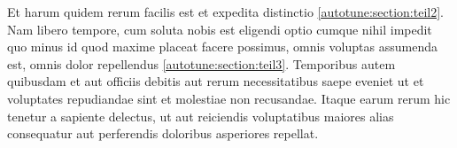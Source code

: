 Et harum quidem rerum facilis est et expedita distinctio
\ref{autotune:section:teil2}.
Nam libero tempore, cum soluta nobis est eligendi optio cumque nihil
impedit quo minus id quod maxime placeat facere possimus, omnis
voluptas assumenda est, omnis dolor repellendus
\ref{autotune:section:teil3}.
Temporibus autem quibusdam et aut officiis debitis aut rerum
necessitatibus saepe eveniet ut et voluptates repudiandae sint et
molestiae non recusandae.
Itaque earum rerum hic tenetur a sapiente delectus, ut aut reiciendis
voluptatibus maiores alias consequatur aut perferendis doloribus
asperiores repellat.



